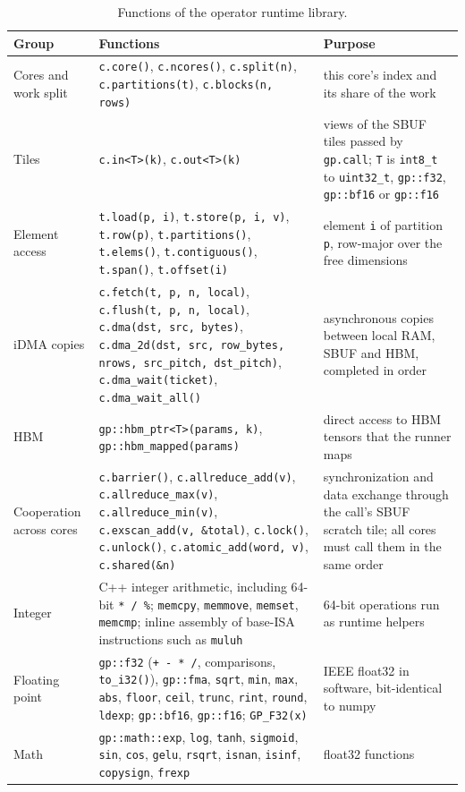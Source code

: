 \documentclass{article}
\newcommand{\code}[1]{\texttt{#1}}
\begin{document}
\begin{table}[!htbp]
  \centering
  \caption{Functions of the operator runtime library.}
  \label{tab:api}
  \footnotesize
  \begin{tabularx}{\linewidth}{@{}P{2.1cm}LP{4.0cm}@{}}
    \toprule
    \textbf{Group} & \textbf{Functions} & \textbf{Purpose} \\
    \midrule
    Cores and work split & \code{c.core()}, \code{c.ncores()}, \code{c.split(n)}, \code{c.partitions(t)}, \code{c.blocks(n, rows)} & this core's index and its share of the work \\
    Tiles & \code{c.in<T>(k)}, \code{c.out<T>(k)} & views of the SBUF tiles passed by \code{gp.call}; \code{T} is \code{int8\_t} to \code{uint32\_t}, \code{gp::f32}, \code{gp::bf16} or \code{gp::f16} \\
    Element access & \code{t.load(p, i)}, \code{t.store(p, i, v)}, \code{t.row(p)}, \code{t.partitions()}, \code{t.elems()}, \code{t.contiguous()}, \code{t.span()}, \code{t.offset(i)} & element \code{i} of partition \code{p}, row-major over the free dimensions \\
    iDMA copies & \code{c.fetch(t, p, n, local)}, \code{c.flush(t, p, n, local)}, \code{c.dma(dst, src, bytes)}, \code{c.dma\_2d(dst, src, row\_bytes, nrows, src\_pitch, dst\_pitch)}, \code{c.dma\_wait(ticket)}, \code{c.dma\_wait\_all()} & asynchronous copies between local RAM, SBUF and HBM, completed in order \\
    HBM & \code{gp::hbm\_ptr<T>(params, k)}, \code{gp::hbm\_mapped(params)} & direct access to HBM tensors that the runner maps \\
    Cooperation across cores & \code{c.barrier()}, \code{c.allreduce\_add(v)}, \code{c.allreduce\_max(v)}, \code{c.allreduce\_min(v)}, \code{c.exscan\_add(v, \&total)}, \code{c.lock()}, \code{c.unlock()}, \code{c.atomic\_add(word, v)}, \code{c.shared(\&n)} & synchronization and data exchange through the call's SBUF scratch tile; all cores must call them in the same order \\
    Integer & C++ integer arithmetic, including 64-bit \code{* / \%}; \code{memcpy}, \code{memmove}, \code{memset}, \code{memcmp}; inline assembly of base-ISA instructions such as \code{muluh} & 64-bit operations run as runtime helpers \\
    Floating point & \code{gp::f32} (\code{+ - * /}, comparisons, \code{to\_i32()}), \code{gp::fma}, \code{sqrt}, \code{min}, \code{max}, \code{abs}, \code{floor}, \code{ceil}, \code{trunc}, \code{rint}, \code{round}, \code{ldexp}; \code{gp::bf16}, \code{gp::f16}; \code{GP\_F32(x)} & IEEE float32 in software, bit-identical to numpy \\
    Math & \code{gp::math::exp}, \code{log}, \code{tanh}, \code{sigmoid}, \code{sin}, \code{cos}, \code{gelu}, \code{rsqrt}, \code{isnan}, \code{isinf}, \code{copysign}, \code{frexp} & float32 functions \\
    \bottomrule
  \end{tabularx}
\end{table}
\end{document}
